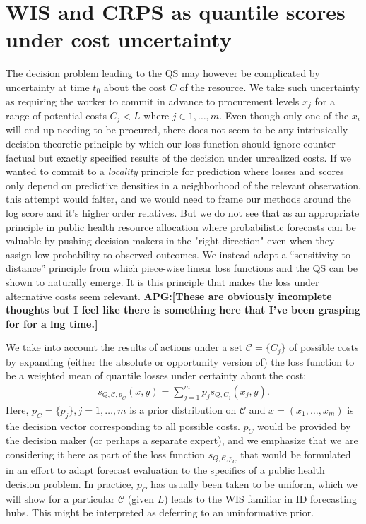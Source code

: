 \documentclass{article}
\def\apg#1{{\color{red}\textbf{APG:[#1]}}}
\begin{document}
\section{WIS and CRPS as quantile scores under cost uncertainty}

The decision problem leading to the QS may however be complicated by uncertainty at time $t_0$ about the cost $C$ of the resource. We take such uncertainty as requiring the worker to commit in advance to procurement levels $x_j$ for a range of potential costs $C_j < L$ where $j \in 1, \ldots, m$.  Even though only one of the $x_i$ will end up needing to be procured, there does not seem to be any intrinsically decision theoretic principle by which our loss function should ignore counter-factual but exactly specified results of the decision under unrealized costs. If we wanted to commit to a \emph{locality} principle for prediction where losses and scores only depend on predictive densities in a neighborhood of the relevant observation, this attempt would falter, and we would need to frame our methods around the log score and it's higher order relatives. But we do not see that as an appropriate principle in public health resource allocation where  
probabilistic forecasts can be valuable by pushing decision makers in the "right direction" even when they assign low probability to observed outcomes. We instead adopt a ``sensitivity-to-distance'' principle from which piece-wise linear loss functions and the QS can be shown to naturally emerge. It is this principle that makes the loss under alternative costs seem relevant. \apg{These are obviously incomplete thoughts but I feel like there is something here that I've been grasping for for a lng time.}

We take into account the results of actions under a set $\mathcal{C} = \{C_j\}$ of possible costs by expanding 
(either the absolute or opportunity version of) the loss function to be a weighted mean of quantile losses under certainty about the cost:
\begin{align}
s_{Q,\mathcal{C}, p_C}(x,y) = \sum_{j=1}^{m}p_js_{Q,C_j}(x_j,y). \label{eqn:sum_CL_loss}
\end{align}
Here, $p_C = \{p_j\}, j = 1,\ldots,m$ is a prior distribution on $\mathcal{C}$ and $x = (x_1,\ldots,x_m)$ is the decision vector corresponding to all possible costs.  $p_C$ would be provided by the decision maker (or perhaps a separate expert), and we emphasize that we are considering it here as part of the loss function $s_{Q,\mathcal{C}, p_C}$ that would be formulated in an effort to adapt forecast evaluation to the specifics of a public health decision problem. In practice, $p_C$ has usually been taken to be uniform, which we will show for a particular $\mathcal{C}$ (given $L$) leads to the WIS familiar in ID forecasting hubs. This might be interpreted as deferring to an uninformative prior. 
\end{document}
